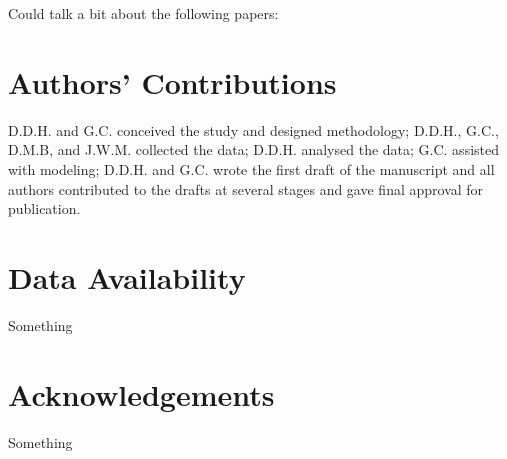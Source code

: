 \documentclass[abstract=on,10pt,a4paper,bibliography=totocnumbered]{article}
\begin{document}
Could talk a bit about the following papers: \citep{Chetkiewicz.2009, Benz.2016,
Mui.2017, Osipova.2019, Kaszta.2021}

\section{Authors' Contributions}
D.D.H. and G.C. conceived the study and designed methodology; D.D.H., G.C.,
D.M.B, and J.W.M. collected the data; D.D.H. analysed the data; G.C. assisted
with modeling; D.D.H. and G.C. wrote the first draft of the manuscript and all
authors contributed to the drafts at several stages and gave final approval for
publication.

\section{Data Availability}
Something

\section{Acknowledgements}
Something

\newpage
\begingroup
\singlespacing
{}
\endgroup
\end{document}
